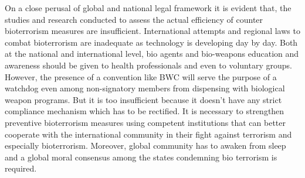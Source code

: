 \begin{multicols}{2}
\noi
On a close perusal of global and national legal framework it is evident that, the studies and
research conducted to assess the actual efficiency of counter bioterrorism measures are
insufficient. International attempts and regional laws to combat bioterrorism are inadequate
as technology is developing day by day. Both at the national and international level, bio
agents and bio-weapons education and awareness should be given to health professionals and
even to voluntary groups. However, the presence of a convention like BWC will serve the
purpose of a watchdog even among non-signatory members from dispensing with biological
weapon programs. But it is too insufficient because it doesn’t have any strict compliance
mechanism which has to be rectified. It is necessary to strengthen preventive bioterrorism
measures using competent institutions that can better cooperate with the international community in their fight against terrorism and especially bioterrorism. Moreover, global community has to awaken from sleep and a global moral consensus among the states condemning bio terrorism is required.

\end{multicols}

